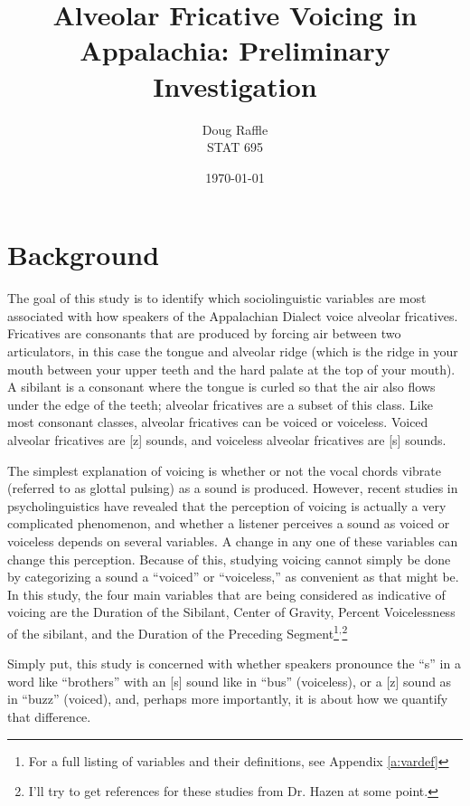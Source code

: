 \documentclass[a4paper]{article}
\title{Alveolar Fricative Voicing in Appalachia: Preliminary Investigation}
\author{Doug Raffle\\STAT 695}
\date{\today}
\begin{document}
\vspace{-30pt}
\maketitle
\tableofcontents
\thispagestyle{empty}

\newpage
\setcounter{page}{1}
\pagestyle{fancy}
\fancyhead{}
\fancyfoot{}
\fancyfoot[LE, RO]{\thepage}
\section*{Background}
The goal of this study is to identify which sociolinguistic
variables are most associated with how speakers of the Appalachian
Dialect voice alveolar fricatives.  Fricatives are consonants
that are produced by forcing air between two articulators, in this
case the tongue and alveolar ridge (which is the ridge in your mouth
between your upper teeth and the hard palate at the top of your
mouth).  A sibilant is a consonant where the tongue is curled so that
the air also flows under the edge of the teeth; alveolar
fricatives are a subset of this class.  Like most consonant classes,
alveolar fricatives can be voiced or voiceless.  Voiced alveolar
fricatives are [z] sounds, and voiceless alveolar fricatives are [s]
sounds.

The simplest explanation of voicing is whether or not the vocal
chords vibrate (referred to as glottal pulsing) as a sound is
produced.  However, recent studies in psycholinguistics have revealed that the
perception of voicing is actually a very complicated phenomenon,
and whether a listener perceives a sound as voiced or voiceless depends
on several variables.  A change in any one of these variables can
change this perception.
Because of this, studying voicing cannot simply be done by
categorizing a sound a ``voiced'' or ``voiceless,'' as convenient as
that might be.  In this study,
the four main variables that are being considered as
indicative of voicing are the Duration of the Sibilant, Center of
Gravity, Percent Voicelessness of the sibilant, and the Duration of
the Preceding Segment\footnote{
  For a full listing of variables and their definitions,
  see Appendix \ref{a:vardef}
}$^,$\footnote{I'll try to get references for these studies from Dr. Hazen
  at some point.
}

Simply put, this study is concerned with whether speakers pronounce
the ``s'' in a word like ``brothers'' with an [s] sound like in
``bus'' (voiceless), or a [z] sound as in ``buzz'' (voiced), and, perhaps more
importantly, it is about how we quantify that difference.
\end{document}
